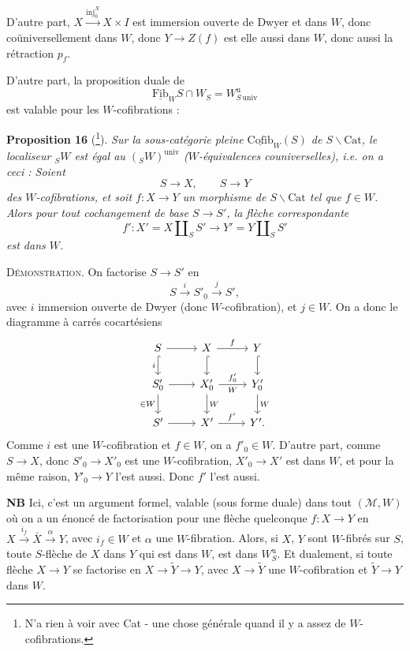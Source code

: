 \documentclass[11pt]{article}
\newcommand{\printedpage}[1]{\marginpar{\footnotesize p.~#1}}
\newcommand{\msp}[1]{\marginpar{\footnotesize [#1]}}
\begin{document}
D'autre part, $X \xrightarrow{\mathrm{inj}_0^X} X \times I$ est immersion ouverte de Dwyer et dans $W$, donc coüniversellement dans $W$, donc $Y \longrightarrow Z(f)$ est elle aussi dans $W$, donc aussi la rétraction $p_f$.

D'autre part, la proposition duale de
\[
\underline{\mathrm{Fib}}_W S \cap W_S = W^{\mathrm{u}}_{S\,\mathrm{univ}}
\]
est valable pour les $W$-cofibrations :

\msp{page 231}
\textbf{Proposition 16} (\footnote[125]{N'a rien à voir avec Cat - une chose générale quand il y a assez de $W$-cofibrations.}). \textit{Sur la sous-catégorie pleine $\underline{\mathrm{Cofib}}_W(S)$ de $S\backslash\mathrm{Cat}$, le localiseur ${}_SW$ est égal au $({}_SW)^{\mathrm{univ}}$ ($W$-équivalences couniverselles), i.e. on a ceci : Soient}
\[
S \longrightarrow X, \qquad S \longrightarrow Y
\]
\textit{des $W$-cofibrations, et soit $f : X \longrightarrow Y$ un morphisme de $S\backslash\mathrm{Cat}$ tel que $f \in W$. Alors pour tout cochangement de base $S \longrightarrow S'$, la flèche correspondante}
\[
f' : X' = X \amalg_S S' \longrightarrow Y' = Y \amalg_S S'
\]
\textit{est dans $W$.}

\textsc{Démonstration}. On factorise $S \longrightarrow S'$ en
\[
S \xrightarrow{i} S'_0 \xrightarrow{j} S',
\]
avec $i$ immersion ouverte de Dwyer (donc $W$-cofibration), et $j \in W$. On a donc le diagramme à carrés cocartésiens
\[
\begin{tikzcd}[ampersand replacement=\&]
S \arrow[r] \arrow[d, hook, "i"'] \& X \arrow[r, "f"] \arrow[d, hook] \& Y \arrow[d, hook] \\
S'_0 \arrow[r] \arrow[d, "\in W"'] \& X'_0 \arrow[r, "f'_0", "W"'] \arrow[d, "W"] \& Y'_0 \arrow[d, "W"] \\
S' \arrow[r] \& X' \arrow[r, "f'"] \& Y'.
\end{tikzcd}
\]
Comme $i$ est une $W$-cofibration et $f \in W$, on a $f'_0 \in W$. D'autre part, comme $S \longrightarrow X$, donc $S'_0 \longrightarrow X'_0$ est
\printedpage{148}
\msp{page 232}
une $W$-cofibration, $X'_0 \longrightarrow X'$ est dans $W$, et pour la même raison, $Y'_0 \longrightarrow Y$ l'est aussi. Donc $f'$ l'est aussi. %

\textbf{NB} Ici, c'est un argument formel, valable (sous forme duale) dans tout $(\mathcal{M}, W)$ où on a un énoncé de factorisation pour une flèche quelconque $f : X \longrightarrow Y$ en $X \xrightarrow{i_f} \bar{X} \xrightarrow{\alpha} Y$, avec $i_f \in W$ et $\alpha$ une $W$-fibration. Alors, si $X$, $Y$ sont $W$-fibrés sur $S$, toute $S$-flèche de $X$ dans $Y$ qui est dans $W$, est dans $W^{\mathrm{u}}_S$. Et dualement, si toute flèche $X \longrightarrow Y$ se factorise en $X \longrightarrow \tilde{Y} \longrightarrow Y$, avec $X \longrightarrow \tilde{Y}$ une $W$-cofibration et $\tilde{Y} \longrightarrow Y$ dans $W$.
\end{document}
